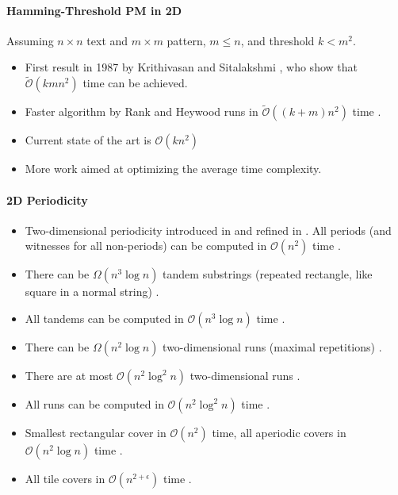 \documentclass[11pt]{article}
\renewcommand{\O}{\mathcal{O}}
\newcommand{\tO}{\tilde{\mathcal{O}}}
\theoremstyle{plain}
\theoremstyle{definition}
\theoremstyle{remark}
\newcommand{\jonas}[2][]{\todo[color=green!40, #1]{\textbf{J:} #2}}
\begin{document}
\paragraph{Hamming-Threshold PM in 2D} Assuming $n \times n$ text and $m \times m$ pattern, $m \leq n$, and threshold $k < m^2$.

\begin{itemize}
	\item First result in 1987 by Krithivasan and Sitalakshmi \cite{Krithivasan1987}, who show that $\tO(kmn^2)$ time can be achieved.
	\item Faster algorithm by Rank and Heywood runs in $\tO((k+m)n^2)$ time \cite{Ranka1991}.
	\item Current state of the art\jonas{check} is $\O(kn^2)$ \cite{Amir1991}
	\item More work \cite{Baeza-Yates1998,Park1998,Kaerkkaeinen1999} aimed at optimizing the average time complexity.
\end{itemize}

\paragraph{2D Periodicity}

\begin{itemize}
	\item Two-dimensional periodicity introduced in \cite{Amir1992} and refined in \cite{Galil1996}. All periods (and witnesses for all non-periods) can be computed in $\O(n^2)$ time \cite{Cole2004}.
	\item There can be $\Omega(n^3 \log n)$ tandem substrings (repeated rectangle, like square in a normal string) \cite{Apostolico2000}.
	\item All tandems can be computed in $\O(n^3 \log n)$ time \cite{Apostolico2005}.
	\item There can be $\Omega(n^2 \log n)$ two-dimensional runs (maximal repetitions) \cite{Gawrychowski2021}.
	\item There are at most $\O(n^2 \log^2 n)$ two-dimensional runs \cite{Charalampopoulos2020}.
	\item All runs can be computed in $\O(n^2 \log^2 n)$ time \cite{Amir2020}.
	\item Smallest rectangular cover in $\O(n^2)$ time, all aperiodic covers in $\O(n^2 \log n)$ time \cite{Charalampopoulos2021}.
	\item All tile covers in $\O(n^{2+\epsilon})$ time \cite{Radoszewski2022}.
\end{itemize}
\end{document}
